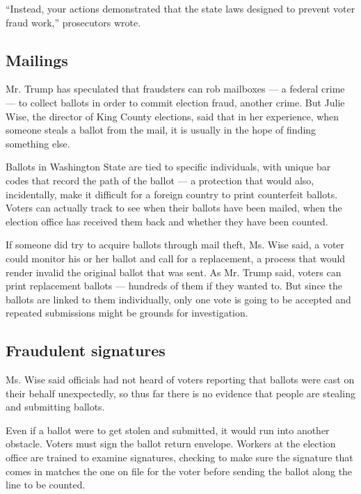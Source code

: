 ``Instead, your actions demonstrated that the state laws designed to
prevent voter fraud work,'' prosecutors wrote.

\hypertarget{mailings}{%
\subsection{Mailings}\label{mailings}}

Mr. Trump has speculated that fraudsters can rob mailboxes --- a federal
crime --- to collect ballots in order to commit election fraud, another
crime. But Julie Wise, the director of King County elections, said that
in her experience, when someone steals a ballot from the mail, it is
usually in the hope of finding something else.

Ballots in Washington State are tied to specific individuals, with
unique bar codes that record the path of the ballot --- a protection
that would also, incidentally, make it difficult for a foreign country
to print counterfeit ballots. Voters can actually track to see when
their ballots have been mailed, when the election office has received
them back and whether they have been counted.

If someone did try to acquire ballots through mail theft, Ms. Wise said,
a voter could monitor his or her ballot and call for a replacement, a
process that would render invalid the original ballot that was sent. As
Mr. Trump said, voters can print replacement ballots --- hundreds of
them if they wanted to. But since the ballots are linked to them
individually, only one vote is going to be accepted and repeated
submissions might be grounds for investigation.

\hypertarget{fraudulent-signatures}{%
\subsection{Fraudulent signatures}\label{fraudulent-signatures}}

Ms. Wise said officials had not heard of voters reporting that ballots
were cast on their behalf unexpectedly, so thus far there is no evidence
that people are stealing and submitting ballots.

Even if a ballot were to get stolen and submitted, it would run into
another obstacle. Voters must sign the ballot return envelope. Workers
at the election office are trained to examine signatures, checking to
make sure the signature that comes in matches the one on file for the
voter before sending the ballot along the line to be counted.

